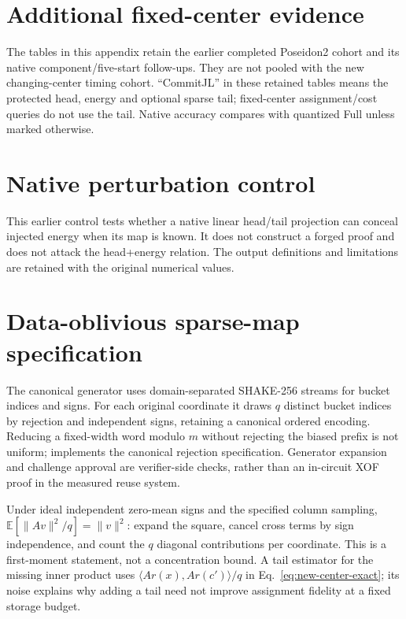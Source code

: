 \section{Additional fixed-center evidence}\label{app:fixed}
The tables in this appendix retain the earlier completed Poseidon2 cohort and its native component/five-start follow-ups. They are not pooled with the new changing-center timing cohort. ``CommitJL'' in these retained tables means the protected head, energy and optional sparse tail; fixed-center assignment/cost queries do not use the tail. Native accuracy compares with quantized Full unless marked otherwise.

\FloatBarrier

\section{Native perturbation control}\label{app:attack}
This earlier control tests whether a native linear head/tail projection can conceal injected energy when its map is known. It does not construct a forged proof and does not attack the head+energy relation. The output definitions and limitations are retained with the original numerical values.

\FloatBarrier

\section{Data-oblivious sparse-map specification}\label{app:jl}
The canonical generator uses domain-separated SHAKE-256 streams for bucket indices and signs. For each original coordinate it draws $q$ distinct bucket indices by rejection and independent signs, retaining a canonical ordered encoding. Reducing a fixed-width word modulo $m$ without rejecting the biased prefix is not uniform;  implements the canonical rejection specification. Generator expansion and challenge approval are verifier-side checks, rather than an in-circuit XOF proof in the measured reuse system.

Under ideal independent zero-mean signs and the specified column sampling, $\mathbb E[\|Av\|^2/q]=\|v\|^2$: expand the square, cancel cross terms by sign independence, and count the $q$ diagonal contributions per coordinate. This is a first-moment statement, not a concentration bound. A tail estimator for the missing inner product uses $\langle Ar(x),Ar(c')\rangle/q$ in Eq.~\eqref{eq:new-center-exact}; its noise explains why adding a tail need not improve assignment fidelity at a fixed storage budget.

